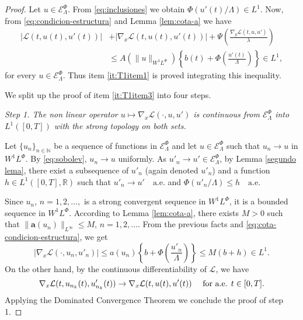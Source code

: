 \documentclass[twoside]{article}
\theoremstyle{remark}
\newcommand{\lphi}{L^{\Phi}}
\newcommand{\wphi}{W^{1}\lphi}
\newcommand{\sobnor}{\|_{W^{1}\lphi}}
\newcommand{\domi}{\mathcal{E}^{\Phi}}
\renewcommand{\b}[1]{\boldsymbol{#1}}
\newcommand{\rr}{\mathbb{R}}
\renewcommand{\leq}{\leqslant}
\begin{document}
\begin{proof}
Let $u\in \domi_{\Lambda}$. From \eqref{eq:inclusiones} we obtain $\Phi( u'(t)/\Lambda) \in L^1$.
Now, from  \eqref{eq:condicion-estructura} and Lemma \ref{lem:cota-a} we have
 \begin{equation}\label{eq:cota-condicion-estructura}
   \begin{split}
|\mathcal{L}(t,u(t),u'(t))|&+ |\nabla_x\mathcal{L}(t,u(t),u'(t))|
+\Psi\left(\frac{\nabla_y\mathcal{L}(t,u,u')}{\lambda}\right)
\\
&\leq A(\|u\sobnor ) \left\{b(t)+ \Phi\left(\frac{u'(t)}{\Lambda}\right) \right\}\in
 L^1,
\end{split}
\end{equation}
for every $u\in \domi_{\Lambda}$.
Thus item \eqref{it:T1item1} is proved integrating this inequality.

We split up the proof of item \ref{it:T1item3} into four steps.

\noindent\emph{Step 1. The non linear operator  $u \mapsto \nabla_x\mathcal{L}(\cdot,u,u')$ is continuous from $\domi_{\Lambda}$ into $L^{1}([0,T])$ with the strong topology on both sets.} 



Let   $\{u_n\}_{n\in \mathbb{N}}$ be a sequence of  functions in $\domi_{\Lambda}$  
and let $u\in \domi_{\Lambda}$  such that $u_n\rightarrow u$ in $\wphi$.
By \eqref{eq:sobolev},  $u_n \to u$ uniformly.
As $u'_n\rightarrow u'\in\domi_{\Lambda}$, by 
  Lemma \ref{segundo lema}, there exist a subsequence of  $u'_{n}$ (again denoted $u'_{n}$) and a function  
	$h\in L^1([0,T],\rr)$
	such that  $u'_{n}\rightarrow u' \quad\text{a.e.}$ and $\Phi(u'_{n}/\Lambda)\leq h\quad\text{a.e}$.  

Since $u_{n}$, $n=1,2,\ldots,$ is a strong convergent sequence in $\wphi$, it is a bounded sequence in $\wphi$. 
According to  Lemma \eqref{lem:cota-a}, 
there exists $M>0$ such that $\|\b{a}(u_{n})\|_{L^{\infty}} \leq M$, $n=1,2,\ldots$.  
From the previous facts and \eqref{eq:cota-condicion-estructura}, we get
\begin{equation*}\label{eq:DxL1-bis}
  |\nabla_x\mathcal{L}(\cdot,u_{n},u'_{n})|\leq a(u_{n})\left\{b+\Phi\left(\frac{u'_{n}}{\Lambda}\right)\right\}\leq
M (b+h) \in L^1.
\end{equation*}
On the other hand, by the continuous differentiability of $\mathcal{L}$, we have
\[\nabla_x\mathcal{L}(t,u_{n_k}(t),u'_{n_k}(t))\to \nabla_x\mathcal{L}(t,u(t),u'(t))\quad\hbox{ for a.e. } t\in[0,T].\]
Applying the Dominated Convergence Theorem we conclude the proof of step 1.



\end{proof}
\end{document}
